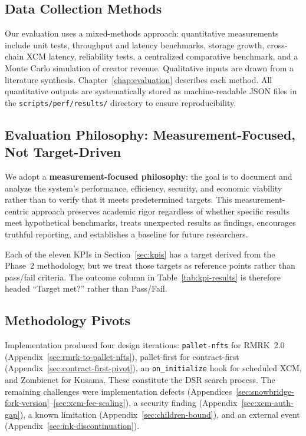 \subsection{Data Collection Methods}\label{subsec:data-collection}

Our evaluation uses a mixed-methods approach: quantitative measurements include unit tests, throughput and latency benchmarks, storage growth, cross-chain XCM latency, reliability tests, a centralized comparative benchmark, and a Monte Carlo simulation of creator revenue. Qualitative inputs are drawn from a literature synthesis. Chapter~\ref{chap:evaluation} describes each method. All quantitative outputs are systematically stored as machine-readable JSON files in the \texttt{scripts/perf/results/} directory to ensure reproducibility.

\subsection[Evaluation Philosophy: Measurement-Focused]{Evaluation Philosophy: Measurement-Focused, Not Target-Driven}\label{subsec:evaluation-philosophy}

We adopt a \textbf{measurement-focused philosophy}: the goal is to document and analyze the system's performance, efficiency, security, and economic viability rather than to verify that it meets predetermined targets. This measurement-centric approach preserves academic rigor regardless of whether specific results meet hypothetical benchmarks, treats unexpected results as findings, encourages truthful reporting, and establishes a baseline for future researchers.

Each of the eleven KPIs in Section~\ref{sec:kpis} has a target derived from the Phase~2 methodology, but we treat those targets as reference points rather than pass/fail criteria. The outcome column in Table~\ref{tab:kpi-results} is therefore headed ``Target met?'' rather than Pass/Fail.

\subsection{Methodology Pivots}\label{subsec:methodology-pivots}

Implementation produced four design iterations: \texttt{pallet-nfts} for RMRK~2.0 (Appendix~\ref{sec:rmrk-to-pallet-nfts}), pallet-first for contract-first (Appendix~\ref{sec:contract-first-pivot}), an \texttt{on\_initialize} hook for scheduled XCM, and Zombienet for Kusama. These constitute the DSR search process. The remaining challenges were implementation defects (Appendices~\ref{sec:snowbridge-fork-version}--\ref{sec:xcm-fee-scaling}), a security finding (Appendix~\ref{sec:xcm-auth-gap}), a known limitation (Appendix~\ref{sec:children-bound}), and an external event (Appendix~\ref{sec:ink-discontinuation}).

